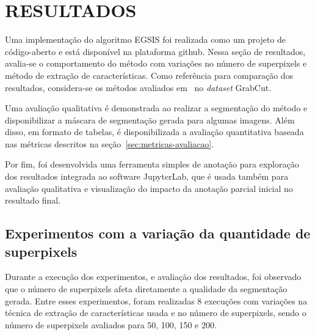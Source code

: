 \chapter{RESULTADOS}\label{chap:resultados}

Uma implementação do algoritmo EGSIS foi realizada como um projeto de
código-aberto e está disponível na plataforma
github\footnotemark. Nessa seção de resultados, avalia-se o
comportamento do método com variações no número de superpixels e
método de extração de características. Como referência para comparação
dos resultados, considera-se os métodos avaliados
em~\cite{wang2023review} no \textit{dataset} GrabCut.


Uma avaliação qualitativa é demonstrada ao realizar a segmentação do
método e disponibilizar a máscara de segmentação gerada para algumas
imagens. Além disso, em formato de tabelas, é disponibilizada a
avaliação quantitativa baseada nas métricas descritos na
seção~\ref{sec:metricas-avaliacao}.

Por fim, foi desenvolvida uma ferramenta simples de anotação para
exploração dos resultados integrada ao software
JupyterLab\footnotemark, que é usada também para avaliação qualitativa
e visualização do impacto da anotação parcial inicial no resultado
final.


\section{Experimentos com a variação da quantidade de superpixels}\label{sec:variacao-superpixels}

Durante a execução dos experimentos, e avaliação dos resultados, foi
observado que o número de superpixels afeta diretamente a qualidade da
segmentação gerada. Entre esses experimentos, foram realizadas 8
execuções com variações na técnica de extração de características
usada e no número de superpixels, sendo o número de superpixels
avaliados para 50, 100, 150 e 200.

